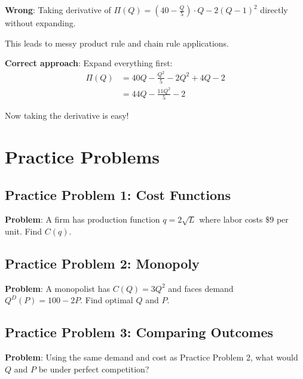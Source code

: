 \documentclass[12pt]{article}
\begin{document}
\begin{warning}
\textbf{Wrong}: Taking derivative of $\Pi(Q) = (40 - \frac{Q}{5}) \cdot Q - 2(Q-1)^2$ directly without expanding.

This leads to messy product rule and chain rule applications.
\end{warning}

\textbf{Correct approach}: Expand everything first:
\begin{align*}
\Pi(Q) &= 40Q - \frac{Q^2}{5} - 2Q^2 + 4Q - 2 \\
&= 44Q - \frac{11Q^2}{5} - 2
\end{align*}

Now taking the derivative is easy!

\newpage

\section{Practice Problems}

\subsection{Practice Problem 1: Cost Functions}

\textbf{Problem}: A firm has production function $q = 2\sqrt{L}$ where labor costs $\$9$ per unit. Find $C(q)$.

\vspace{3cm}

\subsection{Practice Problem 2: Monopoly}

\textbf{Problem}: A monopolist has $C(Q) = 3Q^2$ and faces demand $Q^D(P) = 100 - 2P$. Find optimal $Q$ and $P$.

\vspace{5cm}

\subsection{Practice Problem 3: Comparing Outcomes}

\textbf{Problem}: Using the same demand and cost as Practice Problem 2, what would $Q$ and $P$ be under perfect competition?

\vspace{3cm}

\newpage
\end{document}
